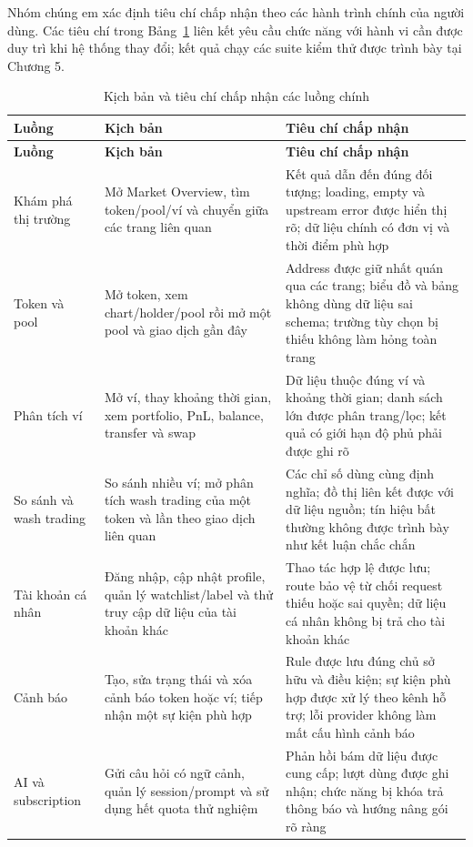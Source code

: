Nhóm chúng em xác định tiêu chí chấp nhận theo các hành trình chính của người dùng. Các tiêu chí trong Bảng~\ref{tab:acceptance_criteria} liên kết yêu cầu chức năng với hành vi cần được duy trì khi hệ thống thay đổi; kết quả chạy các suite kiểm thử được trình bày tại Chương 5.

\small
\begin{longtable}{|p{3.1cm}|p{5.4cm}|p{6.0cm}|}
\caption{Kịch bản và tiêu chí chấp nhận các luồng chính}\label{tab:acceptance_criteria} \\
\hline
\textbf{Luồng} & \textbf{Kịch bản} & \textbf{Tiêu chí chấp nhận} \\
\hline
\endfirsthead
\hline
\textbf{Luồng} & \textbf{Kịch bản} & \textbf{Tiêu chí chấp nhận} \\
\hline
\endhead

Khám phá thị trường & Mở Market Overview, tìm token/pool/ví và chuyển giữa các trang liên quan & Kết quả dẫn đến đúng đối tượng; loading, empty và upstream error được hiển thị rõ; dữ liệu chính có đơn vị và thời điểm phù hợp \\
\hline
Token và pool & Mở token, xem chart/holder/pool rồi mở một pool và giao dịch gần đây & Address được giữ nhất quán qua các trang; biểu đồ và bảng không dùng dữ liệu sai schema; trường tùy chọn bị thiếu không làm hỏng toàn trang \\
\hline
Phân tích ví & Mở ví, thay khoảng thời gian, xem portfolio, PnL, balance, transfer và swap & Dữ liệu thuộc đúng ví và khoảng thời gian; danh sách lớn được phân trang/lọc; kết quả có giới hạn độ phủ phải được ghi rõ \\
\hline
So sánh và wash trading & So sánh nhiều ví; mở phân tích wash trading của một token và lần theo giao dịch liên quan & Các chỉ số dùng cùng định nghĩa; đồ thị liên kết được với dữ liệu nguồn; tín hiệu bất thường không được trình bày như kết luận chắc chắn \\
\hline
Tài khoản cá nhân & Đăng nhập, cập nhật profile, quản lý watchlist/label và thử truy cập dữ liệu của tài khoản khác & Thao tác hợp lệ được lưu; route bảo vệ từ chối request thiếu hoặc sai quyền; dữ liệu cá nhân không bị trả cho tài khoản khác \\
\hline
Cảnh báo & Tạo, sửa trạng thái và xóa cảnh báo token hoặc ví; tiếp nhận một sự kiện phù hợp & Rule được lưu đúng chủ sở hữu và điều kiện; sự kiện phù hợp được xử lý theo kênh hỗ trợ; lỗi provider không làm mất cấu hình cảnh báo \\
\hline
AI và subscription & Gửi câu hỏi có ngữ cảnh, quản lý session/prompt và sử dụng hết quota thử nghiệm & Phản hồi bám dữ liệu được cung cấp; lượt dùng được ghi nhận; chức năng bị khóa trả thông báo và hướng nâng gói rõ ràng \\
\hline
\end{longtable}
\normalsize


